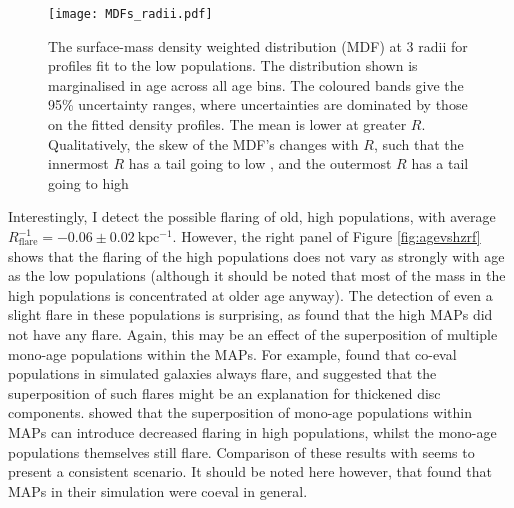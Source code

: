 \begin{figure}
	\texttt{[image: MDFs\_radii.pdf]}
 	\centering
   \caption[Surface-mass denisty weighted \feh{} distribution in 3 radial bins, as found from measurement of mono-age, mono-\feh{} populations in APOGEE DR12]{The surface-mass density weighted \feh{} distribution (MDF) at 3 radii for profiles fit to the low \afe{} populations. The distribution shown is marginalised in age across all age bins. The coloured bands give the 95\% uncertainty ranges, where uncertainties are dominated by those on the fitted density profiles. The mean \feh{} is lower at greater $R$. Qualitatively, the skew of the MDF's changes with $R$, such that the innermost $R$ has a tail going to low \feh{}, and the outermost $R$ has a tail going to high \feh{}}
     \label{fig:mdf}
 \end{figure}

Interestingly, I detect the possible flaring of old, high \afe{} populations, with average $R_{\mathrm{flare}}^{-1} = -0.06 \pm 0.02\ \mathrm{kpc^{-1}}$. However, the right panel of Figure \ref{fig:agevshzrf} shows that the flaring of the high \afe{} populations does not vary as strongly with age as the low \afe{} populations (although it should be noted that most of the mass in the high \afe{} populations is concentrated at older age anyway). The detection of even a slight flare in these populations is surprising, as \citet{2016ApJ...823...30B} found that the high \afe{} MAPs did not have any flare. Again, this may be an effect of the superposition of multiple mono-age populations within the MAPs. For example, \citet{2015ApJ...804L...9M} found that co-eval populations in simulated galaxies always flare, and suggested that the superposition of such flares might be an explanation for thickened disc components. \citet{2017ApJ...834...27M} showed that the superposition of mono-age populations within MAPs can introduce decreased flaring in high \afe{} populations, whilst the mono-age populations themselves still flare. Comparison of these results with \citet{2016ApJ...823...30B} seems to present a consistent scenario. It should be noted here however, that \citet{2013MNRAS.436..625S} found that MAPs in their simulation were coeval in general.

